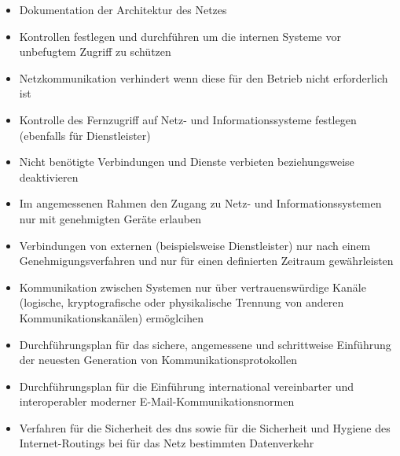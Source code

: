 \documentclass[11pt,a4paper,hidelinks]{article}   %
\begin{document}
            \begin{itemize}
                \item Dokumentation der Architektur des Netzes
                \item Kontrollen festlegen und durchführen um die internen Systeme vor unbefugtem Zugriff zu schützen
                \item Netzkommunikation verhindert wenn diese für den Betrieb nicht erforderlich ist
                \item Kontrolle des Fernzugriff auf Netz- und Informationssysteme festlegen (ebenfalls für Dienstleister)
                \item Nicht benötigte Verbindungen und Dienste verbieten beziehungsweise deaktivieren
                \item Im angemessenen Rahmen den Zugang zu Netz- und Informationssystemen nur mit genehmigten Geräte erlauben
                \item Verbindungen von externen (beispielsweise Dienstleister) nur nach einem Genehmigungsverfahren und nur für einen definierten Zeitraum gewährleisten
                \item Kommunikation zwischen Systemen nur über vertrauenswürdige Kanäle (logische, kryptografische oder physikalische Trennung von anderen Kommunikationskanälen) ermöglcihen
                \item Durchführungsplan für das sichere, angemessene und schrittweise Einführung der neuesten Generation von Kommunikationsprotokollen
                \item Durchführungsplan für die Einführung international vereinbarter und interoperabler moderner E-Mail-Kommunikationsnormen
                \item Verfahren für die Sicherheit des \gls{dns} sowie für die Sicherheit und Hygiene des Internet-Routings bei für das Netz bestimmten Datenverkehr

\end{itemize}
\end{document}

